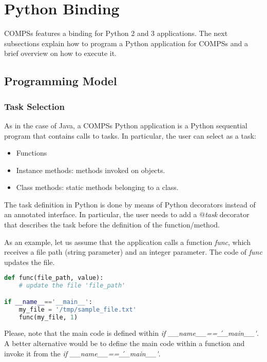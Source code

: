 \section{Python Binding}
\label{sec:Python}

COMPSs features a binding for Python 2 and 3 applications. 
The next subsections explain how to program a Python application for COMPSs and a brief overview on how to execute it.

\subsection{Programming Model}
\label{subsec:Python_programming_model}

\subsubsection{Task Selection}

As in the case of Java, a COMPSs Python application is a Python sequential program that contains calls to tasks. 
In particular, the user can select as a task:

\begin{itemize}
 \item Functions
 \item Instance methods: methods invoked on objects.
 \item Class methods: static methods belonging to a class.
\end{itemize}

The task definition in Python is done by means of Python decorators instead of an annotated interface. 
In particular, the user needs to add a {\it $@$task} decorator that describes the task before the definition of the function/method.

As an example, let us assume that the application calls a function \textit{func}, which receives a file path (string parameter) 
and an integer parameter. The code of \textit{func} updates the file.

\begin{lstlisting}[language=python]
def func(file_path, value):
    # update the file 'file_path'

if __name__=='__main__':
    my_file = '/tmp/sample_file.txt'
    func(my_file, 1)
\end{lstlisting}

Please, note that the main code is defined within \emph{if \_\_name\_\_==\'\_\_main\_\_\'}.
A better alternative would be to define the main code within a function and invoke it from the \emph{if \_\_name\_\_==\'\_\_main\_\_\'}.

